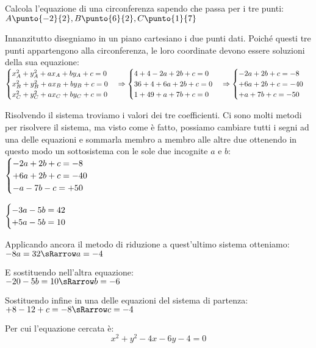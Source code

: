 \begin{esempio}
Calcola l'equazione di una circonferenza sapendo che passa per i tre punti:
\(A\punto{-2}{2}, B\punto{6}{2}, C\punto{1}{7}\)

Innanzitutto disegniamo in un piano cartesiano i due punti dati.
Poiché questi tre punti appartengono alla circonferenza, le loro coordinate 
devono essere soluzioni della sua equazione: \\
\(\begin{cases}x_A^2 +y_A^2 +ax_A +by_A +c = 0 \\
           x_B^2 +y_B^2 +ax_B +by_B +c = 0 \\
           x_C^2 +y_C^2 +ax_C +by_C +c = 0\end{cases} \Rightarrow
  \begin{cases}4 +4 -2a +2b +c = 0 \\
           36 +4 +6a +2b +c = 0 \\
           1 +49 +a +7b +c = 0 \end{cases} \Rightarrow
  \begin{cases}-2a +2b +c = -8 \\
           +6a +2b +c = -40 \\
           +a +7b +c = -50 \end{cases}\)

Risolvendo il sistema troviamo i valori dei tre coefficienti. Ci sono molti 
metodi per risolvere il sistema, ma visto come è fatto, possiamo cambiare tutti 
i segni ad una delle equazioni e sommarla membro a membro alle altre due 
ottenendo in questo modo un sottosistema con le sole due incognite \(a\) e 
\(b\): \\
\(\begin{cases}-2a +2b +c = -8 \\
           +6a +2b +c = -40 \\
           -a -7b -c = +50 \end{cases}\)

\(\begin{cases}-3a -5b = 42 \\
           +5a -5b = 10  \end{cases} \)

Applicando ancora il metodo di riduzione a quest'ultimo sistema otteniamo: \\
\(-8a = 32 \sRarrow a = -4\)

E sostituendo nell'altra equazione: \\
\(-20 -5b = 10 \sRarrow b = -6\)

Sostituendo infine in una delle equazioni del sistema di partenza: \\
\(+8 -12 +c = -8 \sRarrow c = -4\)

Per cui l'equazione cercata è:
\[x^2 +y^2 -4x -6y -4 = 0\]

\end{esempio}

